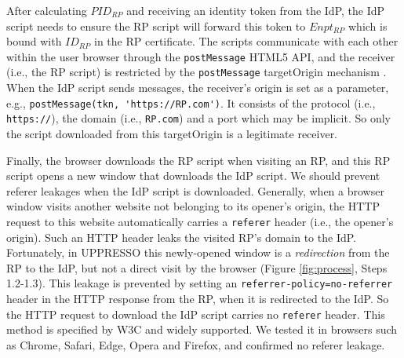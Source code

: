 

After calculating $PID_{RP}$
    and receiving an identity token from the IdP,
    the IdP script needs to ensure the RP script will forward this token to $Enpt_{RP}$
        which is bound with $ID_{RP}$ in the RP certificate.
The scripts communicate with each other within the user browser through the \verb+postMessage+ HTML5 API,
and the receiver (i.e., the RP script)
 is restricted by the \verb+postMessage+ targetOrigin mechanism \cite{postm-targeto}.
When the IdP script sends messages,
 the receiver's origin is set as a parameter,
  e.g., \verb+postMessage(tkn, 'https://RP.com')+.
It consists of
    the protocol (i.e., \verb+https://+),
    the domain  (i.e., \verb+RP.com+)
    and a port which may be implicit.
So only the script downloaded from this targetOrigin is a legitimate receiver.


Finally,
    the browser downloads the RP script when visiting an RP,
     and this RP script opens a new window that downloads the IdP script.
We should prevent referer leakages when the IdP script is downloaded.
Generally, when a browser window visits another website not belonging to its opener's origin,
 the HTTP request to this website automatically carries a \verb+referer+ header (i.e., the opener's origin).
Such an HTTP header leaks the visited RP's domain to the IdP.
Fortunately, in UPPRESSO this newly-opened window is a \emph{redirection} from the RP to the IdP,
 but not a direct visit by the browser (Figure \ref{fig:process}, Steps 1.2-1.3).
This leakage is prevented by setting an \verb+referrer-policy=no-referrer+ header in the HTTP response from the RP, when it is redirected to the IdP.
So the HTTP request to download the IdP script carries no \verb+referer+ header.
This method is specified by W3C \cite{referer_policy} and widely supported.
We tested it in browsers such as Chrome, Safari, Edge, Opera and Firefox, and confirmed no referer leakage.




